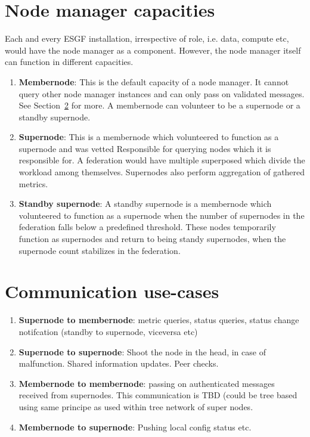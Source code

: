 \documentclass[oneside,12pt]{memoir}
\begin{document}
\section{Node manager capacities}
Each and every ESGF installation, irrespective of role, i.e. data, compute etc, would have the node manager as a component.  However, the node manager itself can function in different capacities. 
\begin{enumerate}
\item \textbf{Membernode}: This is the default capacity of a node manager. It cannot query other node manager instances and can only pass on validated messages. See Section~\ref{commcases} for more. A membernode can volunteer to be a supernode or a standby supernode.
\item \textbf{Supernode}: This is a membernode which volunteered to function as a supernode and was vetted Responsible for querying nodes which it is responsible for.  A federation would have multiple superposed which divide the workload among themselves. Supernodes also perform aggregation of gathered metrics. 
\item \textbf{Standby supernode}: A standby supernode is a membernode which volunteered to function as a supernode when the number of supernodes in the federation falls below a predefined threshold. These nodes temporarily function as supernodes and return to being standy supernodes, when the supernode count stabilizes in the federation.
\end{enumerate}

\section{Communication use-cases}
\label{commcases}



\begin{enumerate}
\item \textbf{Supernode to membernode}: metric queries, status queries, status change notifcation (standby to supernode, viceversa etc)
\item \textbf{Supernode to supernode}: Shoot the node in the head, in case of malfunction.  Shared information updates.  Peer checks.
\item \textbf{Membernode to membernode}: passing on authenticated messages received from supernodes.  This communication is TBD (could be tree based using same principe as used within tree network of super nodes. %
\item \textbf{Membernode to supernode}: Pushing local config status etc.
\end{enumerate}
\end{document}
